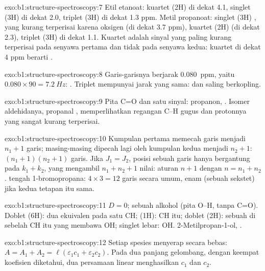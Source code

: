 \begin{solution}{exo:b1:structure-spectroscopy:7}
Etil etanoat: kuartet (2H) di dekat 4.1, singlet (3H) di dekat 2.0,
triplet (3H) di dekat 1.3 ppm. Metil propanoat: singlet (3H) ,
yang kurang terperisai karena oksigen (di dekat 3.7 ppm), kuartet (2H)
 (di dekat 2.3), triplet (3H) di dekat 1.1. Kuartet adalah
sinyal yang paling kurang terperisai pada senyawa pertama dan tidak pada
senyawa kedua: kuartet di dekat 4 ppm berarti .
\end{solution}

\begin{solution}{exo:b1:structure-spectroscopy:8}
Garis-garisnya berjarak \qty{0.080}{ppm}, yaitu $0.080 \times 90 = \qty{7.2}{Hz}$:
. Triplet mempunyai jarak yang sama:  dan
 saling berkopling.
\end{solution}

\begin{solution}{exo:b1:structure-spectroscopy:9}
Pita C=O dan satu sinyal: propanon, . Isomer aldehidanya,
propanal , memperlihatkan regangan C--H gugus  dan
protonnya yang sangat kurang terperisai.
\end{solution}

\begin{solution}{exo:b1:structure-spectroscopy:10}
Kumpulan pertama memecah garis menjadi $n_1 + 1$ garis; masing-masing
dipecah lagi oleh kumpulan kedua menjadi $n_2 + 1$: $(n_1 + 1)(n_2 + 1)$
garis. Jika $J_1 =
J_2$, posisi sebuah garis hanya bergantung pada $k_1 + k_2$, yang
mengambil $n_1 + n_2 +
1$ nilai: aturan $n + 1$ dengan $n = n_1 + n_2$.  tengah
1-bromopropana: $4 \times 3 = 12$ garis secara umum, enam (sebuah
sekstet) jika kedua tetapan itu sama.
\end{solution}

\begin{solution}{exo:b1:structure-spectroscopy:11}
$D = 0$; sebuah alkohol (pita O--H, tanpa C=O). Doblet (6H): dua 
ekuivalen pada satu CH;  (1H): CH itu; doblet (2H): sebuah
 di sebelah CH itu yang membawa OH; singlet lebar: OH.
2-Metilpropan-1-ol, .
\end{solution}

\begin{solution}{exo:b1:structure-spectroscopy:12}
Setiap spesies menyerap secara bebas: $A = A_1 + A_2 = \ell(\varepsilon_1c_1
+ \varepsilon_2c_2)$. Pada dua panjang gelombang, dengan keempat
koefisien diketahui, dua persamaan linear menghasilkan $c_1$ dan $c_2$.
\end{solution}

